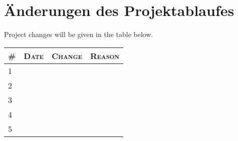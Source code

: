 \documentclass[lang=ngerman,inputenc=utf8,fontsize=10pt]{ldvarticle}
\begin{document}





\section{Änderungen des Projektablaufes}

Project changes will be given in the table below.


\begin{tabular}[htbp]{|p{}||p{}|p{}|p{}|}
	\hline
	\textsc{\#} & \textsc{Date} & \textsc{Change} & \textsc{Reason} \\
	\hline
	\hline
	1 & & & \\[1em]
	\hline
	2 & & & \\[1em]
	\hline
	3 & & & \\[1em]
	\hline
	4 & & & \\[1em]
	\hline
	5 & & & \\[1em]
	\hline
\end{tabular}
\end{document}
